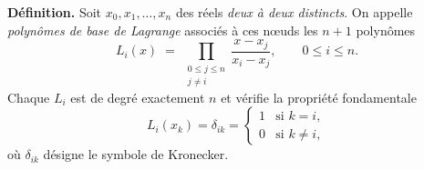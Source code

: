 

\newcommand{\Lbase}[1]{L_{#1}}
\newcommand{\Rn}{\mathbb{R}_n[X]}


\begin{tcolorbox}[thmbox]
  \textbf{Définition.}\enspace{}%
  Soit $x_0, x_1, \ldots, x_n$ des réels \emph{deux à deux distincts}. On
  appelle \emph{polynômes de base de Lagrange} associés à ces nœuds les
  $n+1$ polynômes
  \[
    \Lbase{i}(x) \;=\; \prod_{\substack{0 \leq j \leq n \\ j \neq i}}
    \frac{x - x_j}{x_i - x_j}, \qquad 0 \leq i \leq n.
  \]
  Chaque $\Lbase{i}$ est de degré exactement $n$ et vérifie la propriété
  fondamentale
  \[
    \Lbase{i}(x_k) = \delta_{ik} =
    \begin{cases} 1 & \text{si } k = i, \\ 0 & \text{si } k \neq i, \end{cases}
  \]
  où $\delta_{ik}$ désigne le symbole de Kronecker.


\end{tcolorbox}
